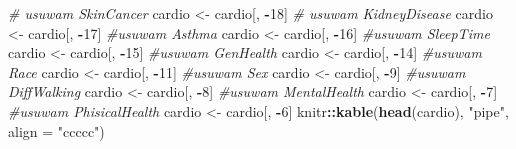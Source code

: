 \documentclass[
]{article}
\newenvironment{Shaded}{\begin{snugshade}}{\end{snugshade}}
\newcommand{\AttributeTok}[1]{\textcolor[rgb]{0.13,0.29,0.53}{#1}}
\newcommand{\CommentTok}[1]{\textcolor[rgb]{0.56,0.35,0.01}{\textit{#1}}}
\newcommand{\DecValTok}[1]{\textcolor[rgb]{0.00,0.00,0.81}{#1}}
\newcommand{\FunctionTok}[1]{\textcolor[rgb]{0.13,0.29,0.53}{\textbf{#1}}}
\newcommand{\NormalTok}[1]{#1}
\newcommand{\OtherTok}[1]{\textcolor[rgb]{0.56,0.35,0.01}{#1}}
\newcommand{\SpecialCharTok}[1]{\textcolor[rgb]{0.81,0.36,0.00}{\textbf{#1}}}
\newcommand{\StringTok}[1]{\textcolor[rgb]{0.31,0.60,0.02}{#1}}
\begin{document}
\begin{Shaded}
\begin{Highlighting}[]
\CommentTok{\# usuwam SkinCancer}
\NormalTok{cardio }\OtherTok{\textless{}{-}}\NormalTok{ cardio[, }\SpecialCharTok{{-}}\DecValTok{18}\NormalTok{]}
\CommentTok{\# usuwam KidneyDisease}
\NormalTok{cardio }\OtherTok{\textless{}{-}}\NormalTok{ cardio[, }\SpecialCharTok{{-}}\DecValTok{17}\NormalTok{]}
\CommentTok{\#usuwam Asthma}
\NormalTok{cardio }\OtherTok{\textless{}{-}}\NormalTok{ cardio[, }\SpecialCharTok{{-}}\DecValTok{16}\NormalTok{]}
\CommentTok{\#usuwam SleepTime}
\NormalTok{cardio }\OtherTok{\textless{}{-}}\NormalTok{ cardio[, }\SpecialCharTok{{-}}\DecValTok{15}\NormalTok{]}
\CommentTok{\#usuwam GenHealth}
\NormalTok{cardio }\OtherTok{\textless{}{-}}\NormalTok{ cardio[, }\SpecialCharTok{{-}}\DecValTok{14}\NormalTok{]}
\CommentTok{\#usuwam Race}
\NormalTok{cardio }\OtherTok{\textless{}{-}}\NormalTok{ cardio[, }\SpecialCharTok{{-}}\DecValTok{11}\NormalTok{]}
\CommentTok{\#usuwam Sex}
\NormalTok{cardio }\OtherTok{\textless{}{-}}\NormalTok{ cardio[, }\SpecialCharTok{{-}}\DecValTok{9}\NormalTok{]}
\CommentTok{\#usuwam DiffWalking}
\NormalTok{cardio }\OtherTok{\textless{}{-}}\NormalTok{ cardio[, }\SpecialCharTok{{-}}\DecValTok{8}\NormalTok{]}
\CommentTok{\#usuwam MentalHealth}
\NormalTok{cardio }\OtherTok{\textless{}{-}}\NormalTok{ cardio[, }\SpecialCharTok{{-}}\DecValTok{7}\NormalTok{]}
\CommentTok{\#usuwam PhisicalHealth}
\NormalTok{cardio }\OtherTok{\textless{}{-}}\NormalTok{ cardio[, }\SpecialCharTok{{-}}\DecValTok{6}\NormalTok{]}
\NormalTok{knitr}\SpecialCharTok{::}\FunctionTok{kable}\NormalTok{(}\FunctionTok{head}\NormalTok{(cardio), }\StringTok{"pipe"}\NormalTok{, }\AttributeTok{align =} \StringTok{"ccccc"}\NormalTok{)}
\end{Highlighting}
\end{Shaded}
\end{document}
